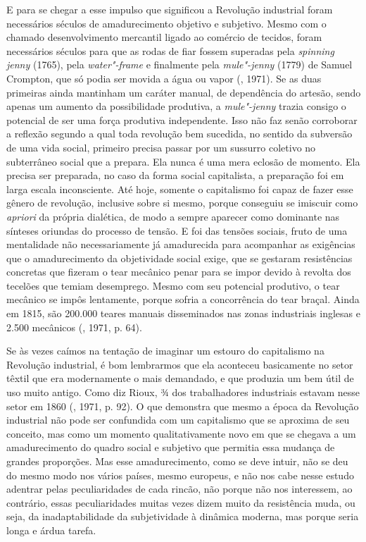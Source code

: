 E para se chegar a esse impulso que significou a Revolução industrial
foram necessários séculos de amadurecimento objetivo e subjetivo. Mesmo
com o chamado desenvolvimento mercantil ligado ao comércio de tecidos,
foram necessários séculos para que as rodas de fiar fossem superadas
pela \emph{spinning jenny} (1765), pela \emph{water"-frame} e finalmente
pela \emph{mule"-jenny} (1779) de Samuel Crompton, que só podia ser
movida a água ou vapor (, 1971). Se as duas primeiras ainda
mantinham um caráter manual, de dependência do artesão, sendo apenas um
aumento da possibilidade produtiva, a \emph{mule"-jenny} trazia consigo o
potencial de ser uma força produtiva independente. Isso não faz senão
corroborar a reflexão segundo a qual toda revolução bem sucedida, no
sentido da subversão de uma vida social, primeiro precisa passar por um
sussurro coletivo no subterrâneo social que a prepara. Ela nunca é uma
mera eclosão de momento. Ela precisa ser preparada, no caso da forma
social capitalista, a preparação foi em larga escala inconsciente. Até
hoje, somente o capitalismo foi capaz de fazer esse gênero de revolução,
inclusive sobre si mesmo, porque conseguiu se imiscuir como
\emph{apriori} da própria dialética, de modo a sempre aparecer como
dominante nas sínteses oriundas do processo de tensão. E foi das tensões
sociais, fruto de uma mentalidade não necessariamente já amadurecida
para acompanhar as exigências que o amadurecimento da objetividade
social exige, que se gestaram resistências concretas que fizeram o tear
mecânico penar para se impor devido à revolta dos tecelões que temiam
desemprego. Mesmo com seu potencial produtivo, o tear mecânico se impôs
lentamente, porque sofria a concorrência do tear braçal. Ainda em 1815,
são 200.000 teares manuais disseminados nas zonas industriais inglesas e
2.500 mecânicos (, 1971, p. 64).

Se às vezes caímos na tentação de imaginar um estouro do capitalismo na
Revolução industrial, é bom lembrarmos que ela aconteceu basicamente no
setor têxtil que era modernamente o mais demandado, e que produzia um
bem útil de uso muito antigo. Como diz Rioux, ¾ dos trabalhadores
industriais estavam nesse setor em 1860 (, 1971, p. 92). O que
demonstra que mesmo a época da Revolução industrial não pode ser
confundida com um capitalismo que se aproxima de seu conceito, mas como
um momento qualitativamente novo em que se chegava a um amadurecimento
do quadro social e subjetivo que permitia essa mudança de grandes
proporções. Mas esse amadurecimento, como se deve intuir, não se deu do
mesmo modo nos vários países, mesmo europeus, e não nos cabe nesse
estudo adentrar pelas peculiaridades de cada rincão, não porque não nos
interessem, ao contrário, essas peculiaridades muitas vezes dizem muito
da resistência muda, ou seja, da inadaptabilidade da subjetividade à
dinâmica moderna, mas porque seria longa e árdua tarefa.

